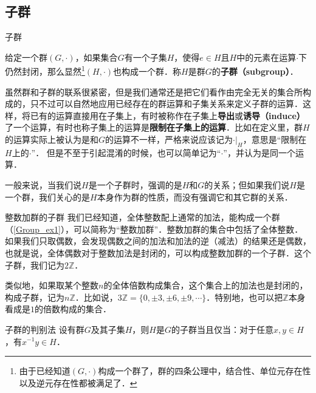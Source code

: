 

\subsection{子群}

\begin{definition}{子群}

给定一个群$(G, \cdot)$，如果集合$G$有一个子集$H$，使得$e\in H$且$H$中的元素在运算$\cdot$下仍然封闭，那么显然\footnote{由于已经知道$(G,\cdot)$构成一个群了，群的四条公理中，结合性、单位元存在性以及逆元存在性都被满足了．}$(H,\cdot)$也构成一个群．称$H$是群$G$的\textbf{子群（subgroup）}．

\end{definition}

虽然群和子群的联系很紧密，但是我们通常还是把它们看作由完全无关的集合所构成的，只不过可以自然地应用已经存在的群运算和子集关系来定义子群的运算．这样，将已有的运算直接用在子集上，有时被称作在子集上\textbf{导出}或\textbf{诱导（induce）}了一个运算，有时也称子集上的运算是\textbf{限制在子集上的运算}．比如在定义里，群$H$的运算实际上被认为是和$G$的运算不一样，严格来说应该记为$\cdot|_H$，意思是“限制在$H$上的$\cdot$”． 但是不至于引起混淆的时候，也可以简单记为“$\cdot$”，并认为是同一个运算．

一般来说，当我们说$H$是一个子群时，强调的是$H$和$G$的关系；但如果我们说$H$是一个群，我们关心的是$H$本身作为群的性质，而没有强调它和其它群的关系．

\begin{example}{整数加群的子群}\label{Group1_ex1}
我们已经知道，全体整数配上通常的加法，能构成一个群（\autoref{Group_ex1}），可以简称为“整数加群”．整数加群的集合中包括了全体整数．如果我们只取偶数，会发现偶数之间的加法和加法的逆（减法）的结果还是偶数，也就是说，全体偶数对于整数加法是封闭的，可以构成整数加群的一个子群．这个子群，我们记为$2\mathbb{Z}$．

类似地，如果取某个整数$n$的全体倍数构成集合，这个集合上的加法也是封闭的，构成子群，记为$n\mathbb{Z}$．比如说，$3\mathbb{Z}=\{0, \pm3, \pm6, \pm9, \cdots\}$．特别地，也可以把$\mathbb{Z}$本身看成是$1$的倍数构成的集合．
\end{example}

\begin{theorem}{子群的判别法}\label{Group1_the3}
设有群$G$及其子集$H$，则$H$是$G$的子群当且仅当：对于任意$x, y\in H$，有$x^{-1}y\in H$．
\end{theorem}

